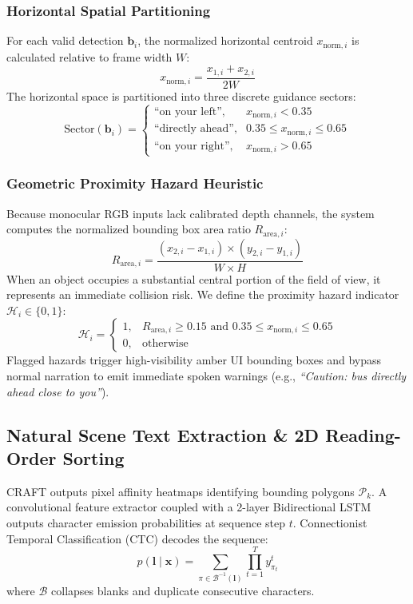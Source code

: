 \documentclass[conference]{IEEEtran}
\begin{document}
\subsubsection{Horizontal Spatial Partitioning}
For each valid detection $\mathbf{b}_i$, the normalized horizontal centroid $x_{\text{norm}, i}$ is calculated relative to frame width $W$:
\begin{equation}
x_{\text{norm}, i} = \frac{x_{1,i} + x_{2,i}}{2W}
\end{equation}
The horizontal space is partitioned into three discrete guidance sectors:
\begin{equation}
\text{Sector}(\mathbf{b}_i) = \begin{cases} 
\text{``on your left''}, & x_{\text{norm}, i} < 0.35 \\
\text{``directly ahead''}, & 0.35 \le x_{\text{norm}, i} \le 0.65 \\
\text{``on your right''}, & x_{\text{norm}, i} > 0.65 
\end{cases}
\end{equation}

\subsubsection{Geometric Proximity Hazard Heuristic}
Because monocular RGB inputs lack calibrated depth channels, the system computes the normalized bounding box area ratio $R_{\text{area}, i}$:
\begin{equation}
R_{\text{area}, i} = \frac{(x_{2,i} - x_{1,i}) \times (y_{2,i} - y_{1,i})}{W \times H}
\end{equation}
When an object occupies a substantial central portion of the field of view, it represents an immediate collision risk. We define the proximity hazard indicator $\mathcal{H}_i \in \{0, 1\}$:
\begin{equation}
\mathcal{H}_i = \begin{cases} 
1, & R_{\text{area}, i} \ge 0.15 \text{ and } 0.35 \le x_{\text{norm}, i} \le 0.65 \\
0, & \text{otherwise}
\end{cases}
\end{equation}
Flagged hazards trigger high-visibility amber UI bounding boxes and bypass normal narration to emit immediate spoken warnings (e.g., \textit{``Caution: bus directly ahead close to you''}).

\subsection{Natural Scene Text Extraction \& 2D Reading-Order Sorting}
CRAFT outputs pixel affinity heatmaps identifying bounding polygons $\mathcal{P}_k$. A convolutional feature extractor coupled with a 2-layer Bidirectional LSTM outputs character emission probabilities at sequence step $t$. Connectionist Temporal Classification (CTC) decodes the sequence:
\begin{equation}
p(\mathbf{l} \mid \mathbf{x}) = \sum_{\pi \in \mathcal{B}^{-1}(\mathbf{l})} \prod_{t=1}^T y_{\pi_t}^t
\end{equation}
where $\mathcal{B}$ collapses blanks and duplicate consecutive characters.
\end{document}

